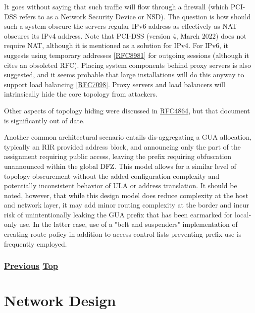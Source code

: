 \documentclass[
]{article}
\begin{document}
It goes without saying that such traffic will flow through a firewall
(which PCI-DSS refers to as a Network Security Device or NSD). The
question is how should such a system obscure the
server\textquotesingle s regular IPv6 address as effectively as NAT
obscures its IPv4 address. Note that PCI-DSS (version 4, March 2022)
does not require NAT, although it is mentioned as a solution for IPv4.
For IPv6, it suggests using temporary addresses
{[}\href{https://www.rfc-editor.org/info/rfc8981}{RFC8981}{]} for
outgoing sessions (although it cites an obsoleted RFC). Placing system
components behind proxy servers is also suggested, and it seems probable
that large installations will do this anyway to support load balancing
{[}\href{https://www.rfc-editor.org/info/rfc7098}{RFC7098}{]}. Proxy
servers and load balancers will intrinsically hide the core topology
from attackers.

Other aspects of topology hiding were discussed in
\href{https://www.rfc-editor.org/info/rfc4864}{RFC4864}, but that
document is significantly out of date.

Another common architectural scenario entails dis-aggregating a GUA
allocation, typically an RIR provided address block, and announcing only
the part of the assignment requiring public access, leaving the prefix
requiring obfuscation unannounced within the global DFZ. This model
allows for a similar level of topology obscurement without the added
configuration complexity and potentially inconsistent behavior of ULA or
address translation. It should be noted, however, that while this design
model does reduce complexity at the host and network layer, it may add
minor routing complexity at the border and incur risk of unintentionally
leaking the GUA prefix that has been earmarked for local-only use. In
the latter case, use of a "belt and suspenders" implementation of
creating route policy in addition to access control lists preventing
prefix use is frequently employed.

\subsubsection{\texorpdfstring{\hyperref[filtering]{Previous}
\hyperref[security]{Top}}{Previous Top}}\label{previous-top-3}

\pagebreak

\section{Network Design}\label{network-design}
\end{document}
